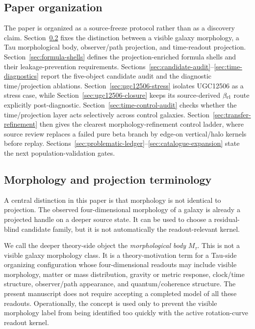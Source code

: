 \documentclass[11pt]{article}
\begin{document}
\subsection{Paper organization}

The paper is organized as a source-freeze protocol rather than as a discovery
claim.  Section~\ref{sec:terminology} fixes the distinction between a visible
galaxy morphology, a Tau morphological body, observer/path projection, and
time-readout projection.  Section~\ref{sec:formula-shells} defines the
projection-enriched formula shells and their leakage-prevention requirements.
Sections~\ref{sec:candidate-audit}--\ref{sec:time-diagnostics} report the
five-object candidate audit and the diagnostic time/projection ablations.
Section~\ref{sec:ugc12506-stress} isolates UGC12506 as a stress case, while
Section~\ref{sec:ugc12506-closure} keeps its source-derived
\(\beta_{\rm cl}\) route explicitly post-diagnostic.  Section~\ref{sec:time-control-audit}
checks whether the time/projection layer acts selectively across control
galaxies.  Section~\ref{sec:transfer-refinement}
then gives the clearest morphology-refinement control ladder, where source
review replaces a failed pure beta branch by edge-on vertical/halo kernels
before replay.  Sections~\ref{sec:problematic-ledger}--\ref{sec:catalogue-expansion}
state the next population-validation gates.

\subsection{Morphology and projection terminology}
\label{sec:terminology}

A central distinction in this paper is that morphology is not identical to
projection.  The observed four-dimensional morphology of a galaxy is already a
projected handle on a deeper source state.  It can be used to choose a
residual-blind candidate family, but it is not automatically the
readout-relevant kernel.

We call the deeper theory-side object the \emph{morphological body}
\(M_\tau\).  This is
not a visible galaxy morphology class.  It is a theory-motivation term for a
Tau-side organizing configuration whose four-dimensional readouts may include
visible morphology, matter or mass distribution, gravity or metric response,
clock/time structure, observer/path appearance, and quantum/coherence
structure.  The present manuscript does not require accepting a completed
model of all these readouts.  Operationally, the concept is used only to
prevent the visible morphology label from being identified too quickly with
the active rotation-curve readout kernel.
\end{document}
